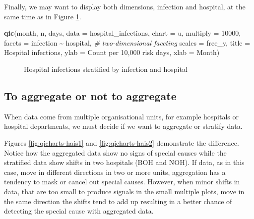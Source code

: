 \documentclass[
]{book}
\makeatletter
\newenvironment{Shaded}{\begin{snugshade}}{\end{snugshade}}
\newcommand{\AttributeTok}[1]{\textcolor[rgb]{0.13,0.29,0.53}{#1}}
\newcommand{\CommentTok}[1]{\textcolor[rgb]{0.56,0.35,0.01}{\textit{#1}}}
\newcommand{\DecValTok}[1]{\textcolor[rgb]{0.00,0.00,0.81}{#1}}
\newcommand{\FunctionTok}[1]{\textcolor[rgb]{0.13,0.29,0.53}{\textbf{#1}}}
\newcommand{\NormalTok}[1]{#1}
\newcommand{\SpecialCharTok}[1]{\textcolor[rgb]{0.81,0.36,0.00}{\textbf{#1}}}
\newcommand{\StringTok}[1]{\textcolor[rgb]{0.31,0.60,0.02}{#1}}
\newcommand*\pandocbounded[1]{%
  \sbox\pandoc@box{#1}%
  \Gscale@div\@tempa{\textheight}{\dimexpr\ht\pandoc@box+\dp\pandoc@box\relax}%
  \Gscale@div\@tempb{\linewidth}{\wd\pandoc@box}%
  \ifdim\@tempb\p@<\@tempa\p@\let\@tempa\@tempb\fi%
  \ifdim\@tempa\p@<\p@\scalebox{\@tempa}{\usebox\pandoc@box}%
  \else\usebox{\pandoc@box}%
  \fi%
}
\makeatother
\begin{document}
Finally, we may want to display both dimensions, infection and hospital, at the same time as in Figure \ref{fig:qicharts-hais5}.

\begin{Shaded}
\begin{Highlighting}[]
\FunctionTok{qic}\NormalTok{(month, n, days, }
    \AttributeTok{data     =}\NormalTok{ hospital\_infections,}
    \AttributeTok{chart    =} \StringTok{\textquotesingle{}u\textquotesingle{}}\NormalTok{,}
    \AttributeTok{multiply =} \DecValTok{10000}\NormalTok{,}
    \AttributeTok{facets   =}\NormalTok{ infection }\SpecialCharTok{\textasciitilde{}}\NormalTok{ hospital,         }\CommentTok{\# two{-}dimensional faceting}
    \AttributeTok{scales   =} \StringTok{\textquotesingle{}free\_y\textquotesingle{}}\NormalTok{,}
    \AttributeTok{title    =} \StringTok{\textquotesingle{}Hospital infections\textquotesingle{}}\NormalTok{,}
    \AttributeTok{ylab     =} \StringTok{\textquotesingle{}Count per 10,000 risk days\textquotesingle{}}\NormalTok{,}
    \AttributeTok{xlab     =} \StringTok{\textquotesingle{}Month\textquotesingle{}}\NormalTok{)}
\end{Highlighting}
\end{Shaded}

\begin{figure}
\centering
\pandocbounded{}
\caption{\label{fig:qicharts-hais5}Hospital infections stratified by infection and hospital}
\end{figure}

\subsection{To aggregate or not to aggregate}\label{to-aggregate-or-not-to-aggregate}

When data come from multiple organisational units, for example hospitals or hospital departments, we must decide if we want to aggregate or stratify data.

Figures \ref{fig:qicharts-hais1} and \ref{fig:qicharts-hais2} demonstrate the difference. Notice how the aggregated data show no signs of special causes while the stratified data show shifts in two hospitals (BOH and NOH). If data, as in this case, move in different directions in two or more units, aggregation has a tendency to mask or cancel out special causes. However, when minor shifts in data, that are too small to produce signals in the small multiple plots, move in the same direction the shifts tend to add up resulting in a better chance of detecting the special cause with aggregated data.
\end{document}
